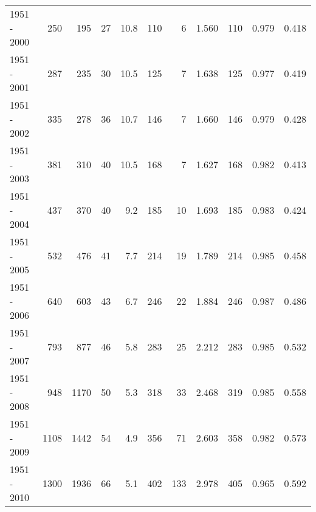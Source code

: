 \begin{tabular}{lrrrrrrrrrr}
1951 - 2000 &      250 &      195 &                27 &              10.8 &                     110 &                          6 &       1.560 &            110 &       0.979 &             0.418 \\
1951 - 2001 &      287 &      235 &                30 &              10.5 &                     125 &                          7 &       1.638 &            125 &       0.977 &             0.419 \\
1951 - 2002 &      335 &      278 &                36 &              10.7 &                     146 &                          7 &       1.660 &            146 &       0.979 &             0.428 \\
1951 - 2003 &      381 &      310 &                40 &              10.5 &                     168 &                          7 &       1.627 &            168 &       0.982 &             0.413 \\
1951 - 2004 &      437 &      370 &                40 &               9.2 &                     185 &                         10 &       1.693 &            185 &       0.983 &             0.424 \\
1951 - 2005 &      532 &      476 &                41 &               7.7 &                     214 &                         19 &       1.789 &            214 &       0.985 &             0.458 \\
1951 - 2006 &      640 &      603 &                43 &               6.7 &                     246 &                         22 &       1.884 &            246 &       0.987 &             0.486 \\
1951 - 2007 &      793 &      877 &                46 &               5.8 &                     283 &                         25 &       2.212 &            283 &       0.985 &             0.532 \\
1951 - 2008 &      948 &     1170 &                50 &               5.3 &                     318 &                         33 &       2.468 &            319 &       0.985 &             0.558 \\
1951 - 2009 &     1108 &     1442 &                54 &               4.9 &                     356 &                         71 &       2.603 &            358 &       0.982 &             0.573 \\
1951 - 2010 &     1300 &     1936 &                66 &               5.1 &                     402 &                        133 &       2.978 &            405 &       0.965 &             0.592 \\

\end{tabular}
